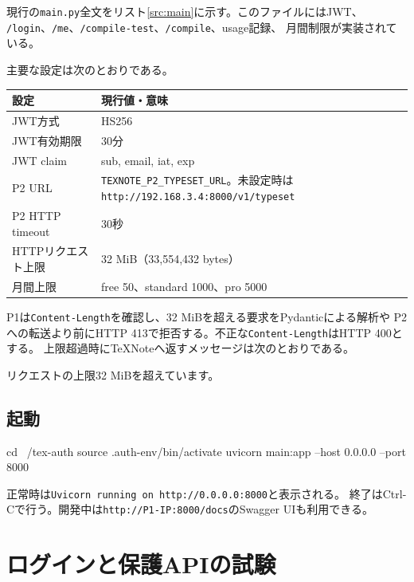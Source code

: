 \documentclass[uplatex,dvipdfmx,a4paper,11pt]{jsarticle}
\begin{document}
現行の\texttt{main.py}全文をリスト\ref{src:main}に示す。このファイルにはJWT、
\texttt{/login}、\texttt{/me}、\texttt{/compile-test}、\texttt{/compile}、usage記録、
月間制限が実装されている。



主要な設定は次のとおりである。

\begin{longtable}{@{}p{48mm}p{102mm}@{}}
\toprule
設定 & 現行値・意味\\
\midrule
JWT方式 & HS256\\
JWT有効期限 & 30分\\
JWT claim & sub, email, iat, exp\\
P2 URL & \texttt{TEXNOTE\_P2\_TYPESET\_URL}。未設定時は\texttt{http://192.168.3.4:8000/v1/typeset}\\
P2 HTTP timeout & 30秒\\
HTTPリクエスト上限 & 32 MiB（33,554,432 bytes）\\
月間上限 & free 50、standard 1000、pro 5000\\
\bottomrule
\end{longtable}

P1は\texttt{Content-Length}を確認し、32 MiBを超える要求をPydanticによる解析や
P2への転送より前にHTTP 413で拒否する。不正な\texttt{Content-Length}はHTTP 400とする。
上限超過時にTeXNoteへ返すメッセージは次のとおりである。

\begin{command}
リクエストの上限32 MiBを超えています。
\end{command}

\subsection{起動}

\begin{command}
cd ~/tex-auth
source .auth-env/bin/activate
uvicorn main:app --host 0.0.0.0 --port 8000
\end{command}

正常時は\texttt{Uvicorn running on http://0.0.0.0:8000}と表示される。
終了はCtrl-Cで行う。開発中は\texttt{http://P1-IP:8000/docs}のSwagger UIも利用できる。

\section{ログインと保護APIの試験}
\end{document}
